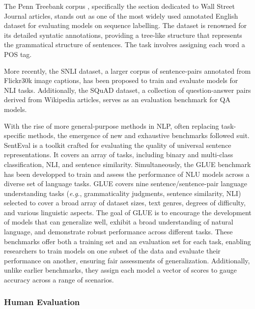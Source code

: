 The Penn Treebank corpus \citep{marcus1993building}, specifically the section dedicated to Wall Street Journal articles, stands out as one of the most widely used annotated English dataset for evaluating models on sequence labelling. The dataset is renowned for its detailed syntatic annotations, providing a tree-like structure that represents the grammatical structure of sentences. The task involves assigning each word a \ac{POS} tag. 

More recently, the \ac{SNLI} dataset, a larger corpus of sentence-pairs annotated from Flickr30k image captions, has been proposed to train and evaluate models for \ac{NLI} tasks. Additionally, the \ac{SQuAD} \citep{rajpurkar2016squad} dataset, a collection of question-answer pairs derived from Wikipedia articles, serves as an evaluation benchmark for \ac{QA} models. 

With the rise of more general-purpose methods in \ac{NLP}, often replacing task-specific methods, the emergence of new and exhaustive benchmarks followed suit. SentEval \citep{conneau2018senteval} is a toolkit crafted for evaluating the quality of universal sentence representations. It covers an array of tasks, including binary and multi-class classification, \ac{NLI}, and sentence similarity. Simultaneously, the \ac{GLUE} benchmark has been developped to train and assess the performance of \ac{NLU} models across a diverse set of language tasks. \ac{GLUE} covers nine sentence/sentence-pair language understanding tasks (\textit{e.g.}, grammaticality judgments, sentence similarity, \ac{NLI}) selected to cover a broad array of dataset sizes, text genres, degrees of difficulty, and various linguistic aspects. The goal of \ac{GLUE} is to encourage the development of models that can generalize well, exhibit a broad understanding of natural language, and demonstrate robust performance across different tasks. 
These benchmarks offer both a training set and an evaluation set for each task, enabling researchers to train models on one subset of the data and evaluate their performance on another, ensuring fair assessments of generalization. Additionally, unlike earlier benchmarks, they assign each model a vector of scores to gauge accuracy across a range of scenarios.


\subsubsection{Human Evaluation} 

